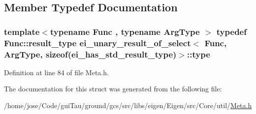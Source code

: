 \subsection{Member Typedef Documentation}
\hypertarget{structei__unary__result__of__select_3_01_func_00_01_arg_type_00_01sizeof_07ei__has__std__result__type_08_4_ab1f27bc4e37dbb80a29d810fd50752f6}{
\subsubsection[{type}]{\setlength{\rightskip}{0pt plus 5cm}template$<$typename Func , typename Arg\-Type $>$ typedef Func\-::result\-\_\-type {\bf ei\-\_\-unary\-\_\-result\-\_\-of\-\_\-select}$<$ Func, Arg\-Type, sizeof({\bf ei\-\_\-has\-\_\-std\-\_\-result\-\_\-type})$>$\-::{\bf type}}}\label{structei__unary__result__of__select_3_01_func_00_01_arg_type_00_01sizeof_07ei__has__std__result__type_08_4_ab1f27bc4e37dbb80a29d810fd50752f6}


Definition at line 84 of file Meta.\-h.



The documentation for this struct was generated from the following file\-:\begin{DoxyCompactItemize}
\item 
/home/jose/\-Code/gui\-Tau/ground/gcs/src/libs/eigen/\-Eigen/src/\-Core/util/\hyperlink{_meta_8h}{Meta.\-h}\end{DoxyCompactItemize}
